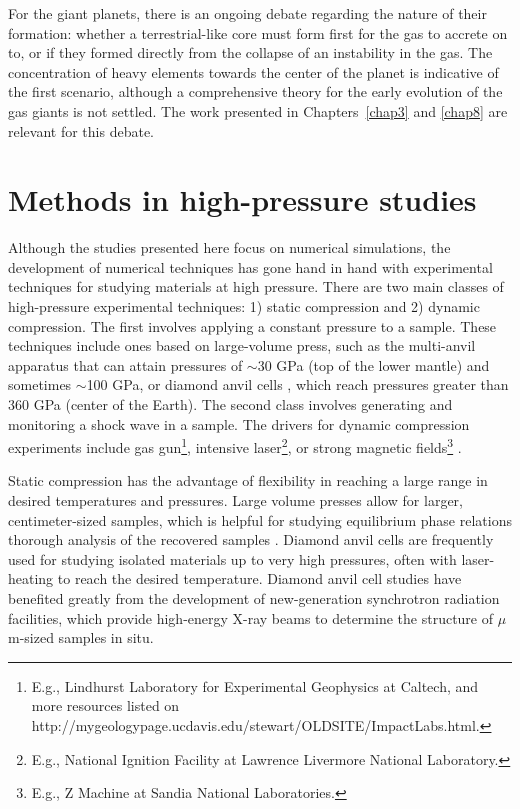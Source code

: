 For the giant planets, there is an ongoing debate regarding the nature of their 
formation: whether a terrestrial-like core must form first for the gas to accrete 
on to, or if they formed directly from the collapse of an instability in the gas. 
The concentration of heavy elements towards the center of the planet is 
indicative of the first scenario, although a comprehensive theory for the 
early evolution of the gas giants is not settled. The work presented in 
Chapters~\ref{chap3} and \ref{chap8} are relevant for this debate.

\section{Methods in high-pressure studies}

Although the studies presented here focus on numerical simulations, the
development of numerical techniques has gone hand in hand with experimental
techniques  for studying materials at high pressure.  There are two main
classes of high-pressure experimental techniques: 1) static compression and 2)
dynamic compression. The first involves applying a constant pressure to a
sample. These techniques include ones based on large-volume press, such as the
multi-anvil apparatus \cite{Ito2007} that can attain pressures of $\sim$30 GPa
(top of the lower mantle) and sometimes $\sim$100 GPa, or diamond anvil cells
\cite{Mao2007}, which reach pressures greater than 360 GPa (center of the
Earth). The second class involves generating and monitoring a shock wave in a
sample. The drivers for dynamic compression experiments include gas
gun\footnote{E.g., Lindhurst Laboratory for Experimental Geophysics at Caltech,
    and more resources listed on
http://mygeologypage.ucdavis.edu/stewart/OLDSITE/ImpactLabs.html.}, intensive
laser\footnote{E.g., National Ignition Facility at Lawrence Livermore National
Laboratory.}, or strong magnetic fields\footnote{E.g., Z Machine at  Sandia
National Laboratories.} \cite{Asimow2015}.

Static compression has the advantage of flexibility in reaching a large range in
desired temperatures and pressures. Large volume presses allow for larger,
centimeter-sized samples, which is helpful for studying equilibrium phase
relations thorough analysis of the recovered samples . Diamond anvil cells are
frequently used for studying isolated materials up to very high pressures,
often with laser-heating to reach the desired temperature. Diamond anvil cell
studies  have benefited greatly from the development of new-generation
synchrotron radiation facilities, which provide high-energy X-ray beams to
determine the structure of $\mu$m-sized samples in situ.

